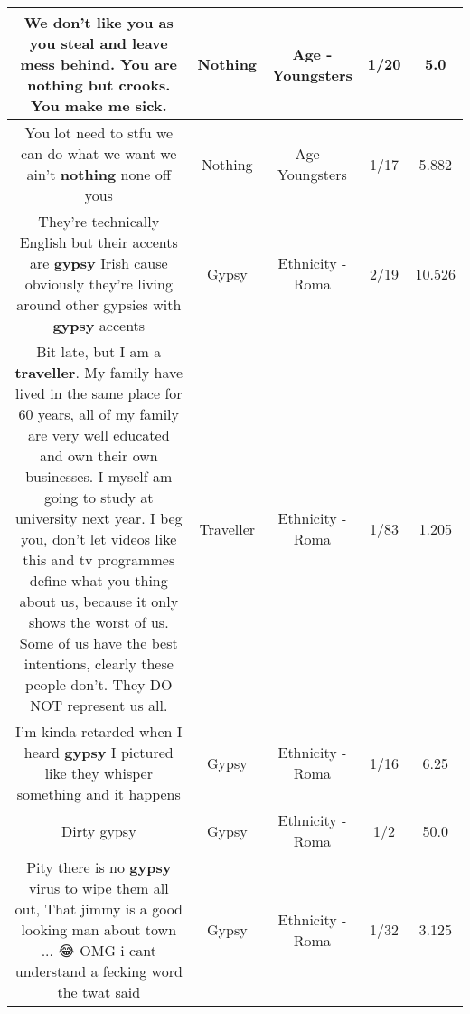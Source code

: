 \documentclass[11pt]{article}
\newlength\mylength
\begin{document}
\begin{center}
\begin{longtable}{|C{.65\mylength}|C{.30\mylength}|C{.12\mylength}|C{.12\mylength}|C{.12\mylength}|}
  \small We don't like you as you steal and leave mess behind. You are \textbf{nothing} but crooks. You make me sick.\normalsize   & Nothing & Age - Youngsters & 1/20 & 5.0 \\  \hline
  \small You lot need to stfu we can do what we want we ain't \textbf{nothing} none off yous\normalsize   & Nothing & Age - Youngsters & 1/17 & 5.882 \\  \hline
  \small They're technically English but their accents are \textbf{gypsy} Irish cause obviously they're living around other gypsies with \textbf{gypsy} accents\normalsize   & Gypsy & Ethnicity - Roma & 2/19 & 10.526 \\  \hline
  \small Bit late, but I am a \textbf{traveller}. My family have lived in the same place for 60 years, all of my family are very well educated and own their own businesses. I myself am going to study at university next year. I beg you, don't let videos like this and tv programmes define what you thing about us, because it only shows the worst of us. Some of us have the best intentions, clearly these people don't. They DO NOT represent us all.\normalsize   & Traveller & Ethnicity - Roma & 1/83 & 1.205 \\  \hline
  \small I'm kinda retarded when I heard \textbf{gypsy} I pictured like they whisper something and it happens\normalsize   & Gypsy & Ethnicity - Roma & 1/16 & 6.25 \\  \hline
  \small Dirty gypsy\normalsize   & Gypsy & Ethnicity - Roma & 1/2 & 50.0 \\  \hline
  \small Pity there is no \textbf{gypsy} virus to wipe them all out,  That jimmy is a good looking man about town ... 😂 OMG i cant understand a fecking word the twat said\normalsize   & Gypsy & Ethnicity - Roma & 1/32 & 3.125 \\  \hline

\end{longtable}
\end{center}
\end{document}
